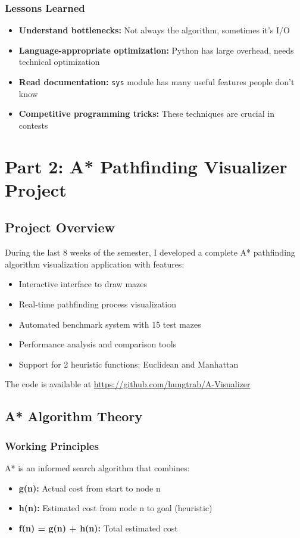 \documentclass[12pt,a4paper]{article}
\begin{document}
\subsubsection{Lessons Learned}
\begin{itemize}
    \item \textbf{Understand bottlenecks:} Not always the algorithm, sometimes it's I/O
    \item \textbf{Language-appropriate optimization:} Python has large overhead, needs technical optimization
    \item \textbf{Read documentation:} \texttt{sys} module has many useful features people don't know
    \item \textbf{Competitive programming tricks:} These techniques are crucial in contests
\end{itemize}

\newpage
\section{Part 2: A* Pathfinding Visualizer Project}

\subsection{Project Overview}
During the last 8 weeks of the semester, I developed a complete A* pathfinding algorithm visualization application with features:
\begin{itemize}
    \item Interactive interface to draw mazes
    \item Real-time pathfinding process visualization
    \item Automated benchmark system with 15 test mazes
    \item Performance analysis and comparison tools
    \item Support for 2 heuristic functions: Euclidean and Manhattan
\end{itemize}

The code is available at \url{https://github.com/hungtrab/A-Visualizer}

\subsection{A* Algorithm Theory}

\subsubsection{Working Principles}
A* is an informed search algorithm that combines:
\begin{itemize}
    \item \textbf{g(n):} Actual cost from start to node n
    \item \textbf{h(n):} Estimated cost from node n to goal (heuristic)
    \item \textbf{f(n) = g(n) + h(n):} Total estimated cost
\end{itemize}
\end{document}
